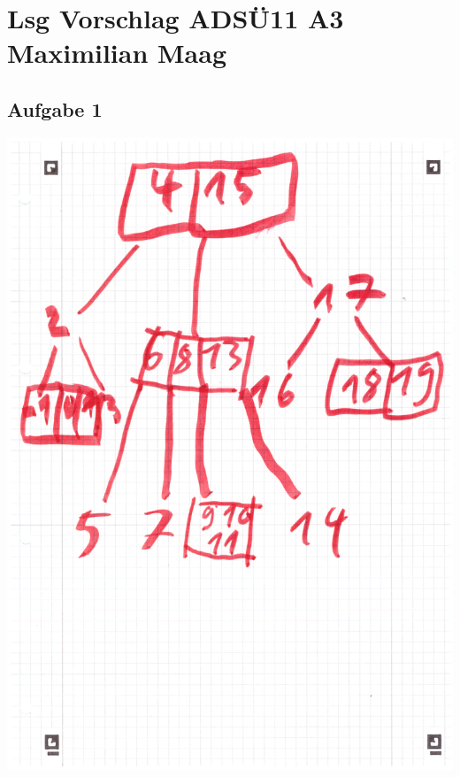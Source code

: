 \documentclass{article}
\begin{document}
	\section*{Lsg Vorschlag ADSÜ11 A3 Maximilian Maag}
	\subsection*{Aufgabe 1}
	\includegraphics[width=\linewidth]{A30101}
\end{document}
